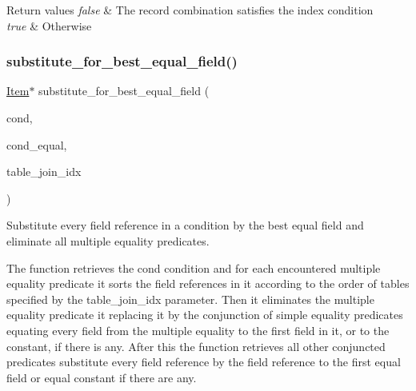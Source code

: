 \begin{DoxyRetVals}{Return values}
{\em false} & The record combination satisfies the index condition \\
\hline
{\em true} & Otherwise \\
\hline
\end{DoxyRetVals}
\mbox{\label{group__Query__Optimizer_ga253393c0747cf378b9cefa109662bd17}} 
\subsubsection{\texorpdfstring{substitute\+\_\+for\+\_\+best\+\_\+equal\+\_\+field()}{substitute\_for\_best\_equal\_field()}}
{\footnotesize\ttfamily \mbox{\hyperlink{classItem}{Item}}$\ast$ substitute\+\_\+for\+\_\+best\+\_\+equal\+\_\+field (\begin{DoxyParamCaption}\item[{\mbox{\hyperlink{classItem}{Item}} $\ast$}]{cond,  }\item[{C\+O\+N\+D\+\_\+\+E\+Q\+U\+AL $\ast$}]{cond\+\_\+equal,  }\item[{void $\ast$}]{table\+\_\+join\+\_\+idx }\end{DoxyParamCaption})}

Substitute every field reference in a condition by the best equal field and eliminate all multiple equality predicates.

The function retrieves the cond condition and for each encountered multiple equality predicate it sorts the field references in it according to the order of tables specified by the table\+\_\+join\+\_\+idx parameter. Then it eliminates the multiple equality predicate it replacing it by the conjunction of simple equality predicates equating every field from the multiple equality to the first field in it, or to the constant, if there is any. After this the function retrieves all other conjuncted predicates substitute every field reference by the field reference to the first equal field or equal constant if there are any.


